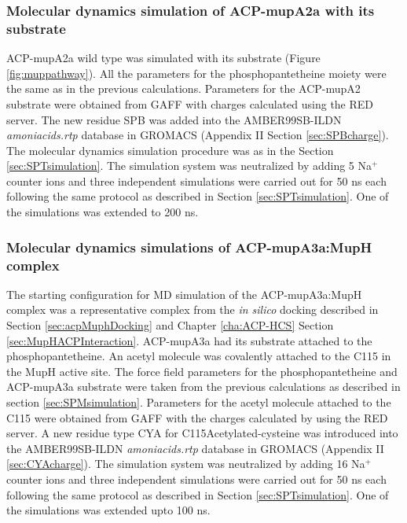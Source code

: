 			\subsubsection{Molecular dynamics simulation of ACP-mupA2a with its substrate}
			\label{sec:SPBsimulation}
			ACP-mupA2a wild type was simulated with its substrate (Figure \ref{fig:muppathway}). All the parameters for the phosphopantetheine moiety were the same as in the previous calculations. Parameters for the ACP-mupA2 substrate were obtained from GAFF with charges calculated using the RED server. The new residue SPB was added into the AMBER99SB-ILDN \textit{amoniacids.rtp} database in GROMACS (Appendix II Section \ref{sec:SPBcharge}). The molecular dynamics simulation procedure was as in the Section \ref{sec:SPTsimulation}. The simulation system was neutralized by adding 5 Na$ ^{+} $ counter ions and three independent simulations were carried out for 50 ns each following the same protocol as described in Section  \ref{sec:SPTsimulation}. One of the simulations was extended to 200 ns. 
			
			\subsubsection{Molecular dynamics simulations of ACP-mupA3a:MupH complex}
			\label{sec:mdAcpMuph}
			The starting configuration for MD simulation of the ACP-mupA3a:MupH complex was a representative complex from the \textit{in silico} docking described in Section \ref{sec:acpMuphDocking} and Chapter \ref{cha:ACP-HCS} Section \ref{sec:MupHACPInteraction}. ACP-mupA3a had its substrate attached to the phosphopantetheine. %
			An acetyl molecule was covalently attached to the C115 in the MupH active site. The force field parameters for the phosphopantetheine and ACP-mupA3a substrate were taken from the previous calculations as described in section \ref{sec:SPMsimulation}. Parameters for the acetyl molecule attached to the C115 were obtained from GAFF with the charges calculated by using the RED server. A new residue type CYA for C115Acetylated-cysteine was introduced into the AMBER99SB-ILDN \textit{amoniacids.rtp} database in GROMACS (Appendix II \ref{sec:CYAcharge}). The simulation system was neutralized by adding 16 Na$ ^{+} $ counter ions and three independent simulations were carried out for 50 ns each following the same protocol as described in Section  \ref{sec:SPTsimulation}. One of the simulations was extended upto 100 ns.
			
